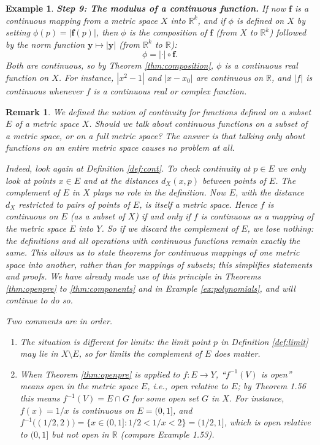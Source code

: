 \documentclass{article}
\theoremstyle{mythm}
\newtheorem{remark}[theorem]{Remark}
\newtheorem{example}[theorem]{Example}
\begin{document}
\begin{example}
\textbf{Step 9: The modulus of a continuous function.} If now $\mathbf{f}$ is a continuous mapping from a metric space $X$ into $\mathbb{R}^k$, and if $\phi$ is defined on $X$ by setting $\phi(p) = |\mathbf{f}(p)|$, then $\phi$ is the composition of $\mathbf{f}$ (from $X$ to $\mathbb{R}^k$) followed by the norm function $\mathbf{y} \mapsto |\mathbf{y}|$ (from $\mathbb{R}^k$ to $\mathbb{R}$):
\[
\phi = |\cdot| \circ \mathbf{f}.
\]
Both are continuous, so by Theorem \ref{thm:composition}, $\phi$ is a continuous real function on $X$. For instance, $|x^2 - 1|$ and $|x - x_0|$ are continuous on $\mathbb{R}$, and $|f|$ is continuous whenever $f$ is a continuous real or complex function.
\end{example}

\begin{remark}\label{rem:subset}
We defined the notion of continuity for functions defined on a subset $E$ of a metric space $X$. Should we talk about continuous functions on a subset of a metric space, or on a full metric space? The answer is that talking only about functions on an entire metric space causes no problem at all.

Indeed, look again at Definition \ref{def:cont}. To check continuity at $p \in E$ we only look at points $x \in E$ and at the distances $d_X(x,p)$ between points of $E$. The complement of $E$ in $X$ plays \textit{no role} in the definition. Now $E$, with the distance $d_X$ restricted to pairs of points of $E$, is itself a metric space. Hence $f$ is continuous on $E$ (as a subset of $X$) if and only if $f$ is continuous as a mapping of the metric space $E$ into $Y$. So if we discard the complement of $E$, we lose nothing: the definitions and all operations with continuous functions remain exactly the same. This allows us to state theorems for continuous mappings of one metric space into another, rather than for mappings of subsets; this simplifies statements and proofs. We have already made use of this principle in Theorems \ref{thm:openpre} to \ref{thm:components} and in Example \ref{ex:polynomials}, and will continue to do so.

Two comments are in order.
\begin{enumerate}
    \item The situation is different for \textit{limits}: the limit point $p$ in Definition \ref{def:limit} may lie in $X \setminus E$, so for limits the complement of $E$ does matter.
    \item When Theorem \ref{thm:openpre} is applied to $f : E \to Y$, ``$f^{-1}(V)$ is open'' means open in the metric space $E$, i.e., open \textit{relative to} $E$; by Theorem 1.56 this means $f^{-1}(V) = E \cap G$ for some open set $G$ in $X$. For instance, $f(x) = 1/x$ is continuous on $E = (0,1]$, and $f^{-1}\big((1/2,2)\big) = \{x \in (0,1] : 1/2 < 1/x < 2\} = (1/2, 1]$, which is open relative to $(0,1]$ but not open in $\mathbb{R}$ (compare Example 1.53).
\end{enumerate}
\end{remark}
\end{document}
